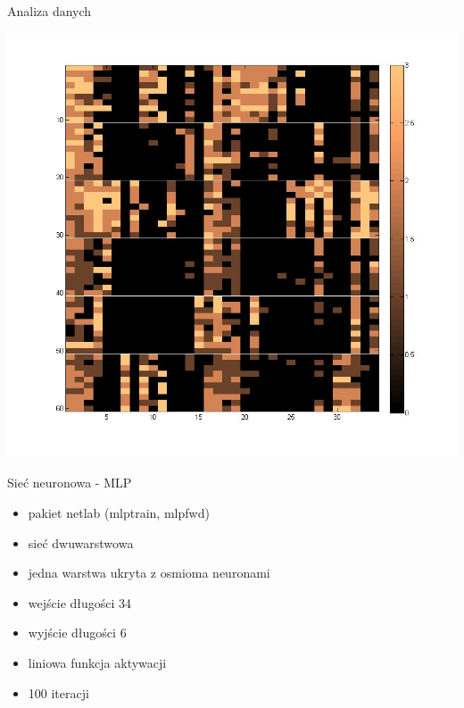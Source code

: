 \documentclass{beamer}
\begin{document}
\begin{frame}{Analiza danych}

\begin{center}
  \includegraphics[scale=0.3]{img/data_imagesc.jpg}  
\end{center}

\end{frame}

\begin{frame}{Sieć neuronowa - MLP}
\begin{itemize}
\item pakiet netlab (mlptrain, mlpfwd)
\item sieć dwuwarstwowa
\item jedna warstwa ukryta z osmioma neuronami
\item wejście długości 34
\item wyjście długości 6
\item liniowa funkcja aktywacji
\item 100 iteracji 
\end{itemize}
\end{frame}
\end{document}
